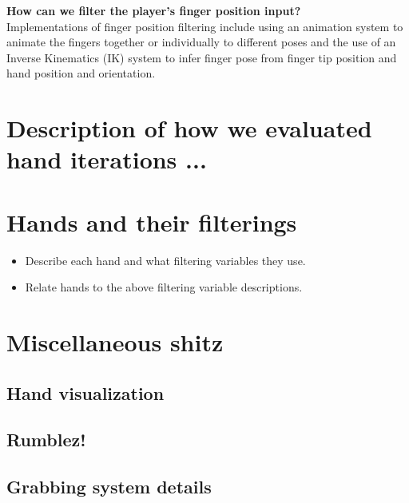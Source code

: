 \textbf{How can we filter the player's finger position input?}\\
Implementations of finger position filtering include using an animation system to animate the fingers together or individually to different poses and the use of an Inverse Kinematics (IK) system to infer finger pose from finger tip position and hand position and orientation.


\section{Description of how we evaluated hand iterations ...}
\label{sec:DESCRIPTIONOFEVALUATIONSCENARIOS}

\section{Hands and their filterings}
\label{sec:LABELABOUTHANDSVERSIONS}
\begin{itemize}
\item Describe each hand and what filtering variables they use.
\item Relate hands to the above filtering variable descriptions.
\end{itemize}


\section{Miscellaneous shitz}
\label{sec:MISCELLANEOUSSHITZ}

\subsection{Hand visualization}
\label{subsec:handVisualization}

\subsection{Rumblez!}
\label{subsec:RUMLBEZ}

\subsection{Grabbing system details}
\label{subsec:grabbingSystem}